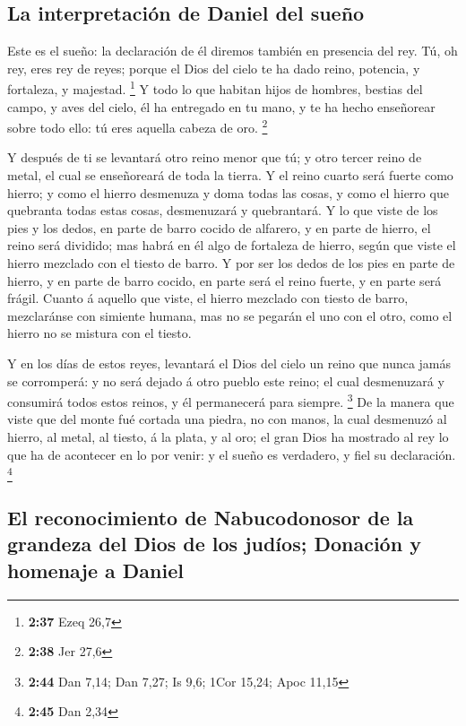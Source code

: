 \hypertarget{la-interpretaciuxf3n-de-daniel-del-sueuxf1o}{%
\subsection{La interpretación de Daniel del
sueño}\label{la-interpretaciuxf3n-de-daniel-del-sueuxf1o}}

 Este es el sueño: la declaración de él diremos también
en presencia del rey.  Tú, oh rey, eres rey de reyes;
porque el Dios del cielo te ha dado reino, potencia, y fortaleza, y
majestad. \footnote{\textbf{2:37} Ezeq 26,7}  Y todo lo
que habitan hijos de hombres, bestias del campo, y aves del cielo, él ha
entregado en tu mano, y te ha hecho enseñorear sobre todo ello: tú eres
aquella cabeza de oro. \footnote{\textbf{2:38} Jer 27,6}

 Y después de ti se levantará otro reino menor que tú; y
otro tercer reino de metal, el cual se enseñoreará de toda la tierra.
 Y el reino cuarto será fuerte como hierro; y como el
hierro desmenuza y doma todas las cosas, y como el hierro que quebranta
todas estas cosas, desmenuzará y quebrantará.  Y lo que
viste de los pies y los dedos, en parte de barro cocido de alfarero, y
en parte de hierro, el reino será dividido; mas habrá en él algo de
fortaleza de hierro, según que viste el hierro mezclado con el tiesto de
barro.  Y por ser los dedos de los pies en parte de
hierro, y en parte de barro cocido, en parte será el reino fuerte, y en
parte será frágil.  Cuanto á aquello que viste, el hierro
mezclado con tiesto de barro, mezclaránse con simiente humana, mas no se
pegarán el uno con el otro, como el hierro no se mistura con el tiesto.

 Y en los días de estos reyes, levantará el Dios del
cielo un reino que nunca jamás se corromperá: y no será dejado á otro
pueblo este reino; el cual desmenuzará y consumirá todos estos reinos, y
él permanecerá para siempre. \footnote{\textbf{2:44} Dan 7,14; Dan 7,27;
  Is 9,6; 1Cor 15,24; Apoc 11,15}  De la manera que viste
que del monte fué cortada una piedra, no con manos, la cual desmenuzó al
hierro, al metal, al tiesto, á la plata, y al oro; el gran Dios ha
mostrado al rey lo que ha de acontecer en lo por venir: y el sueño es
verdadero, y fiel su declaración. \footnote{\textbf{2:45} Dan 2,34}

\hypertarget{el-reconocimiento-de-nabucodonosor-de-la-grandeza-del-dios-de-los-juduxedos-donaciuxf3n-y-homenaje-a-daniel}{%
\subsection{El reconocimiento de Nabucodonosor de la grandeza del Dios
de los judíos; Donación y homenaje a
Daniel}\label{el-reconocimiento-de-nabucodonosor-de-la-grandeza-del-dios-de-los-juduxedos-donaciuxf3n-y-homenaje-a-daniel}}

